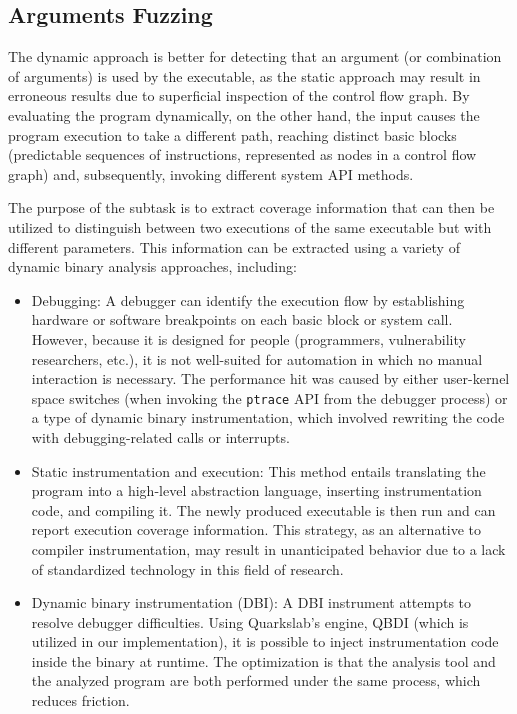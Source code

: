 \documentclass[../main.tex]{subfiles}
\begin{document}
\hypertarget{arguments-fuzzing}{%
  \subsection{Arguments Fuzzing}\label{arguments-fuzzing}}

The dynamic approach is better for detecting that an argument (or combination
of arguments) is used by the executable, as the static approach may result in
erroneous results due to superficial inspection of the control flow graph. By
evaluating the program dynamically, on the other hand, the input causes the
program execution to take a different path, reaching distinct basic blocks
(predictable sequences of instructions, represented as nodes in a control flow
graph) and, subsequently, invoking different system API methods.

The purpose of the subtask is to extract coverage information that can then be
utilized to distinguish between two executions of the same executable but with
different parameters. This information can be extracted using a variety of
dynamic binary analysis approaches, including:

\begin{itemize}
  \tightlist
  \item
        Debugging: A debugger can identify the execution flow by establishing
        hardware or software breakpoints on each basic block or system call.
        However, because it is designed for people (programmers, vulnerability
        researchers, etc.), it is not well-suited for automation in which no
        manual interaction is necessary. The performance hit was caused by
        either user-kernel space switches (when invoking the \texttt{ptrace}
        API from the debugger process) or a type of dynamic binary
        instrumentation, which involved rewriting the code with
        debugging-related calls or interrupts.
  \item
        Static instrumentation and execution: This method entails translating
        the program into a high-level abstraction language, inserting
        instrumentation code, and compiling it. The newly produced executable
        is then run and can report execution coverage information. This
        strategy, as an alternative to compiler instrumentation, may result in
        unanticipated behavior due to a lack of standardized technology in
        this field of research.
  \item
        Dynamic binary instrumentation (DBI): A DBI instrument
        attempts to resolve debugger difficulties. Using Quarkslab's engine,
        QBDI (which is utilized in our implementation), it is possible to
        inject instrumentation code inside the binary at runtime. The
        optimization is that the analysis tool and the analyzed program are
        both performed under the same process, which reduces friction.
\end{itemize}
\end{document}
